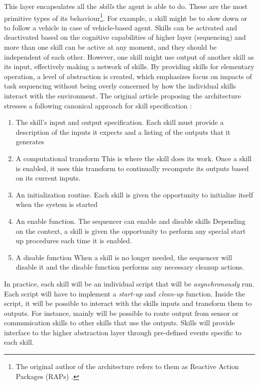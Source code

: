 \documentclass[main.tex]{subfiles}
\begin{document}
This layer encapsulates all the \emph{skills} the agent is able to do. These are the 
most primitive types of its behaviour\footnote{The original author of the architecture refers to them 
as Reactive Action Packages (RAPs) \cite{Firby1987}.}. For example, a skill might be to slow
down or to follow a vehicle in case of vehicle-based agent. Skills can be activated and deactivated based 
on the cognitive capabilities of higher layer (sequencing) and more than one skill can be active at 
any moment, and they should be independent of each other. However, one skill might use output of another 
skill as its input, effectively making a network of skills. By providing skills for elementary operation,
a level of abstraction is created, which emphasizes focus on impacts of task sequencing without being 
overly concerned by how the individual skills interact with the environment. The original article 
proposing the architecture stresses a following canonical approach for skill specification
\cite{Bonasso1995}:

\begin{enumerate}
    \item The skill's input and output specification. Each skill must provide a
description of the inputs it expects and a listing of the outputs that it
generates 
    \item A computational transform This is where the skill does its work. Once a
skill is enabled, it uses this transform to continually recompute its outputs
based on its current inputs.
    \item An initialization routine. Each skill is given the opportunity to initialize itself when the system is started 
    \item An enable function. The sequencer can enable and disable skills Depending on the
    context, a skill is given the opportunity to perform any special start up procedures each
    time it is enabled.
    \item A disable function When a skill is no longer needed, the sequencer will disable it
    and the disable function performs any necessary cleanup actions.
\end{enumerate}

In practice, each skill will be an individual script that will be \emph{asynchronously} run.
Each script will have to implement a \emph{start-up} and \emph{clean-up} function.
Inside the script, it will be possible to interact with the skills inputs and transform them to 
outputs. For instance, mainly will be possible to route output from sensor or communication skills
to other skills that use the outputs. Skills will provide interface to the higher abstraction layer 
through pre-defined events specific to each skill.
\end{document}
